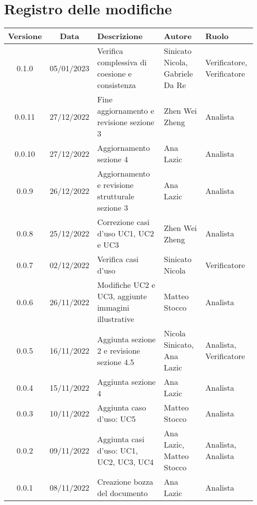 \section*{Registro delle modifiche}
\begin{center}
\renewcommand\tabularxcolumn[1]{>{\Centering}m{#1}}
\begin{tabularx}{\textwidth}{| c | c | X | X | X |} 
	\hline
	\textbf{Versione} & \textbf{Data} & \textbf{Descrizione} & \textbf{Autore} & \textbf{Ruolo}\\
	\hline
	0.1.0 & 05/01/2023 & Verifica complessiva di coesione e consistenza & Sinicato Nicola, Gabriele Da Re & Verificatore, Verificatore\\
	\hline
	0.0.11 & 27/12/2022 & Fine aggiornamento e revisione sezione 3 & Zhen Wei Zheng & Analista\\
      \hline
	0.0.10 & 27/12/2022 & Aggiornamento sezione 4 & Ana Lazic & Analista\\
      \hline
	0.0.9 & 26/12/2022 & Aggiornamento e revisione strutturale sezione 3 & Ana Lazic & Analista\\
	\hline
	0.0.8 & 25/12/2022 & Correzione casi d'uso UC1, UC2 e UC3 & Zhen Wei Zheng & Analista\\
	\hline
	0.0.7 & 02/12/2022 & Verifica casi d'uso & Sinicato Nicola & Verificatore\\
	\hline
	0.0.6 & 26/11/2022 & Modifiche UC2 e UC3, aggiunte immagini illustrative & Matteo Stocco & Analista\\
	\hline
	0.0.5 & 16/11/2022	 & Aggiunta sezione 2 e revisione sezione 4.5 & Nicola Sinicato, Ana Lazic & Analista, Verificatore\\
	\hline
	0.0.4 & 15/11/2022	 & Aggiunta sezione 4 & Ana Lazic & Analista\\
	\hline
	0.0.3 & 10/11/2022 & Aggiunta caso d’uso: UC5 & Matteo Stocco & Analista\\
	\hline
	0.0.2 & 09/11/2022	 & Aggiunta casi d’uso: UC1, UC2, UC3, UC4 & Ana Lazic, Matteo Stocco & Analista, Analista\\
	\hline
	0.0.1 & 08/11/2022 & Creazione bozza del documento & Ana Lazic & Analista\\
	\hline
\end{tabularx}		
\end{center}

